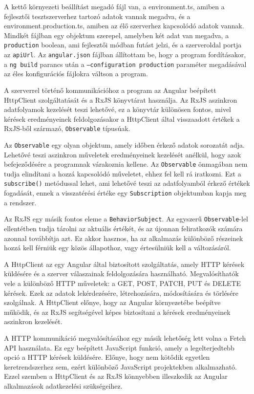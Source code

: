 A kettő környezeti beállítást megadó fájl van, a environment.ts, amiben a fejlesztői tesztszerverhez tartozó adatok vannak megadva, és a environment.production.ts, amiben az élő szerverhez kapcsolódó adatok vannak. Mindkét fájlban egy objektum szerepel, amelyben két adat van megadva, a \texttt{production} boolean, ami fejlesztői módban futást jelzi, és a szerveroldal portja az \texttt{apiUrl}. Az \texttt{angular.json} fájlban állítottam be, hogy a program fordításakor, a \texttt{ng build} parancs után a \texttt{--configuration production} paraméter megadásával az éles konfigurációs fájlokra váltson a program.


A szerverrel történő kommunikációhoz a program az Angular beépített HttpClient szolgáltatását és a RxJS könyvtárat használja. Az RxJS aszinkron adatfolyamok kezelését teszi lehetővé, ez a könyvtár különösen fontos, mivel kérések eredményeinek feldolgozásakor a HttpClient által visszaadott értékek a RxJS-ből származó, \texttt{Observable} típusúak.

Az \texttt{Observable} egy olyan objektum, amely időben érkező adatok sorozatát adja. Lehetővé teszi aszinkron műveletek eredményeinek kezelését anélkül, hogy azok befejeződésére a programnak várakoznia kellene. Az \texttt{Observable} önmagában nem tudja elindítani a hozzá kapcsolódó műveletet, ehhez fel kell rá iratkozni. Ezt a \texttt{subscribe()} metódussal lehet, ami lehetővé teszi az adatfolyamból érkező értékek fogadását, ennek a visszatérési értéke egy \texttt{Subscription} objektumban kapja meg a rendszer.

Az RxJS egy másik fontos eleme a \texttt{BehaviorSubject}. Az egyszerű \texttt{Observable}-lel ellentétben tudja tárolni az aktuális értékét, és az újonnan feliratkozók számára azonnal továbbítja azt. Ez akkor hasznos, ha az alkalmazás különböző részeinek hozzá kell férniük egy közös állapothoz, vagy értesülniük kell a változásáról.

A HttpClient az egy Angular által biztosított szolgáltatás, amely HTTP kérések küldésére és a szerver válaszainak feldolgozására használható. Megvalósíthatók vele a különböző HTTP műveletek: a GET, POST, PATCH, PUT és DELETE kérések. Ezek az adatok lekérdezésére, létrehozására, módosítására és törlésére szolgálnak. A HttpClient előnye, hogy az Angular környezetébe beépítve működik, és az RxJS segítségével képes biztosítani a kérések eredményeinek aszinkron kezelését.

A HTTP kommunikáció megvalósításához egy másik lehetőség lett volna a Fetch API használata. Ez egy beépített JavaScript funkció, amely a legelterjedtebb opció a HTTP kérések küldésére. Előnye, hogy nem kötődik egyetlen keretrendszerhez sem, ezért különböző JavaScript projektekben alkalmazható. Ezzel szemben a HttpClient és az RxJS könnyebben illeszkedik az Angular alkalmazások adatkezelési szükségeihez.

